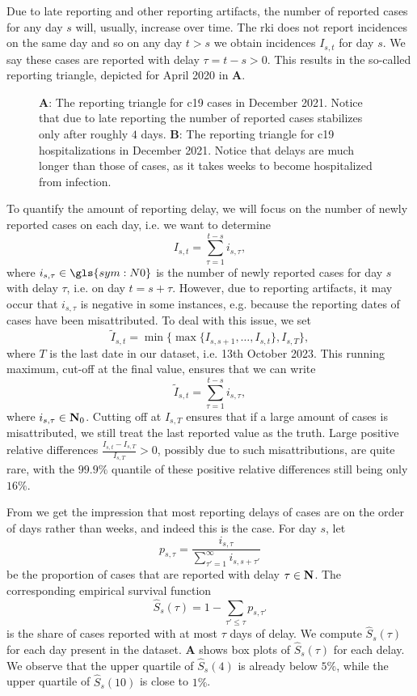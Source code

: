 Due to late reporting and other reporting artifacts, the number of reported cases for any day $s$ will, usually, increase over time. The \acrshort{rki} does not report incidences on the same day and so on any day $t > s$ we obtain incidences $I_{s,t}$ for day $s$. We say these cases are reported with delay $\tau = t -s > 0$. This results in the so-called reporting triangle, depicted for April 2020 in  \textbf{A}. 

\begin{figure}
    \resizebox{\textwidth}{!}{%
    }
    \caption{\textbf{A}: The reporting triangle for \acrshort{c19} cases in December 2021. Notice that due to late reporting the number of reported cases stabilizes only after roughly $4$ days. \textbf{B}: The reporting triangle for \acrshort{c19} hospitalizations in December 2021. Notice that delays are much longer than those of cases, as it takes weeks to become hospitalized from infection.}
    \label{fig:reporting_delays_cases}
\end{figure}

To quantify the amount of reporting delay, we will focus on the number of newly reported cases on each day, i.e. we want to determine
$$
    I_{s,t} = \sum_{\tau = 1}^{t - s} i_{s,\tau},
$$
where $i_{s,\tau} \in \gls{sym:N0}$ is the number of newly reported cases for day $s$ with delay $\tau$, i.e. on day $t = s + \tau$. However, due to reporting artifacts, it may occur that $i_{s,\tau}$ is negative in some instances, e.g. because the reporting dates of cases have been misattributed. To deal with this issue, we set 
$$
    \tilde I_{s,t} = \min \{\max \{I_{s,s + 1}, \dots, I_{s, t}\}, I_{s, T}\},
$$
where $T$ is the last date in our dataset, i.e. 13th October 2023. This running maximum, cut-off at the final value, ensures that we can write 
$$
    \tilde I_{s,t} =  \sum_{\tau = 1}^{t - s} i_{s,\tau},
$$
where $i_{s,\tau} \in \mathbf N_0$. Cutting off at $I_{s,T}$ ensures that if a large amount of cases is misattributed, we still treat the last reported value as the truth. Large positive relative differences $ \frac{I_{s, t} - I_{s,T}}{I_{s,T}} > 0$, possibly due to such misattributions, are quite rare, with the $99.9\%$ quantile of these positive relative differences still being only $16\%$.

From  we get the impression that most reporting delays of cases are on the order of days rather than weeks, and indeed this is the case. For day $s$, let
$$
    p_{s,\tau} = \frac{i_{s,\tau}}{\sum_{\tau' = 1}^\infty i_{s,s + \tau'}}
$$
be the proportion of cases that are reported with delay $\tau \in\mathbf N$. The corresponding empirical survival function 
$$
    \hat S_{s}(\tau) = 1 - \sum_{\tau' \leq \tau} p_{s,\tau'}
$$
is the share of cases reported with at most $\tau$ days of delay. We compute $\hat S_s(\tau)$ for each day present in the dataset.  \textbf{A} shows box plots of $\hat S_{s}(\tau)$ for each delay. We observe that the upper quartile of $\hat S_s(4)$ is already below $5\%$, while the upper quartile of $\hat S_s(10)$ is close to $1\%$. 

